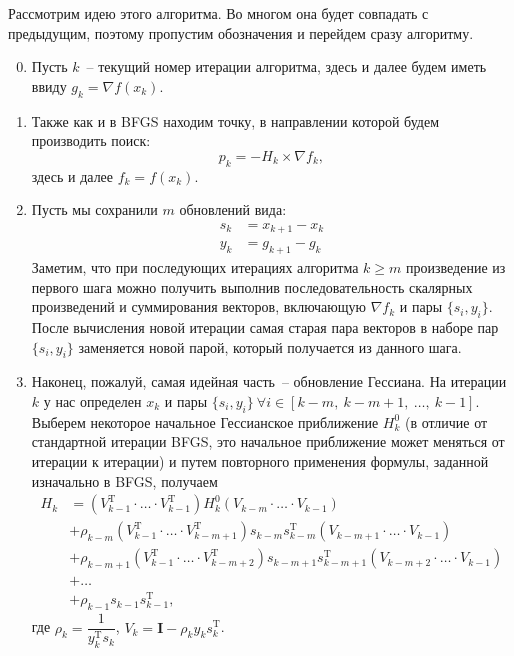 \documentclass[12pt, a4paper, oneside, final]{article}
\begin{document}
	Рассмотрим идею этого алгоритма.
	Во многом она будет совпадать с предыдущим, поэтому пропустим обозначения и перейдем сразу алгоритму.
	\begin{enumerate}[1)]
		\setcounter{enumi}{-1}
		\item Пусть $k$~-- текущий номер итерации алгоритма, здесь и далее будем иметь ввиду $g_{k} = \nabla{f(x_{k})}$.
		\item Также как и в BFGS находим точку, в направлении которой будем производить поиск:
		\[
			p_{k} = -H_{k} \times \nabla{f_{k}},
		\] здесь и далее $f_{k} = f(x_{k})$.
		\item Пусть мы сохранили $m$ обновлений вида:
		\begin{align*}
			s_{k} &= x_{k + 1} - x_{k} \\
			y_{k} &= g_{k + 1} - g_{k}
		\end{align*}
		Заметим, что при последующих итерациях алгоритма $k \geqslant m$ произведение из первого шага можно получить выполнив последовательность скалярных произведений и суммирования векторов, включающую $\nabla{f_{k}}$ и пары $\{s_{i}, y_{i}\}$.
		После вычисления новой итерации самая старая пара векторов в наборе пар $\{s_{i}, y_{i}\}$ заменяется новой парой, который получается из данного шага.
		\item Наконец, пожалуй, самая идейная часть~-- обновление Гессиана.
		На итерации $k$ у нас определен $x_{k}$ и пары $\{s_{i}, y_{i}\}~\forall i \in [k - m, ~ k - m + 1, ~ \ldots, ~ k - 1]$.
		Выберем некоторое начальное Гессианское приближение $H_{k}^{0}$ (в отличие от стандартной итерации BFGS, это начальное приближение может меняться от итерации к итерации) и путем повторного применения формулы, заданной изначально в BFGS, получаем
		\begin{align*}
			H_{k} &= (V_{k - 1}^{\mathrm{T}} \cdot \ldots \cdot V_{k - 1}^{\mathrm{T}}) H_{k}^{0} (V_{k - m} \cdot \ldots \cdot V_{k - 1}) \\
			&+ \rho_{k - m}(V_{k - 1}^{\mathrm{T}} \cdot \ldots \cdot V_{k - m + 1}^{\mathrm{T}})s_{k - m}s_{k - m}^{\mathrm{T}}(V_{k - m + 1} \cdot \ldots \cdot V_{k - 1}) \\
			&+ \rho_{k - m + 1}(V_{k - 1}^{\mathrm{T}} \cdot \ldots \cdot V_{k - m + 2}^{\mathrm{T}})s_{k - m + 1}s_{k - m + 1}^{\mathrm{T}}(V_{k - m + 2} \cdot \ldots \cdot V_{k - 1}) \\
			&+ \ldots \\
			&+ \rho_{k - 1}s_{k - 1}s_{k - 1}^{\mathrm{T}},
		\end{align*} где $\rho_{k} = \dfrac{1}{y^{\mathrm{T}}_{k}s_{k}}$, $V_{k} = \mathbf{I} - \rho_{k}y_{k}s_{k}^{\mathrm{T}}$.

\end{enumerate}
\end{document}
